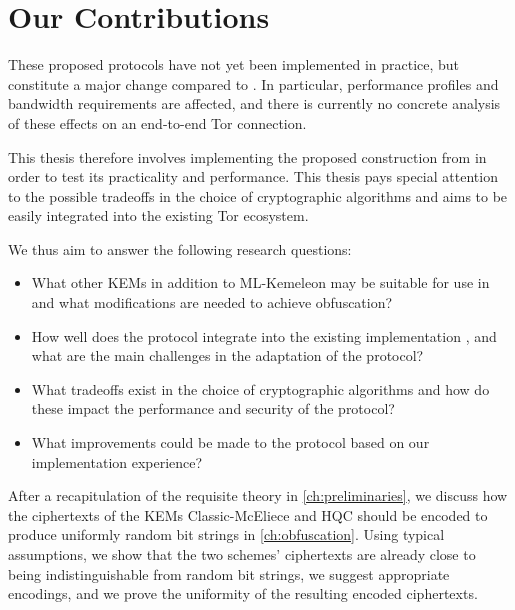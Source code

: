 \section{Our Contributions} \label{sec:contributions}

These proposed protocols have not yet been implemented in practice, but constitute a major change compared to \obfsfour{}.
In particular, performance profiles and bandwidth requirements are affected, and there is currently no concrete analysis of these effects on an end-to-end Tor connection.

This thesis therefore involves implementing the proposed \drivel{} construction from \cite{EPRINT:GRSV25} in order to test its practicality and performance.
This thesis pays special attention to the possible tradeoffs in the choice of cryptographic algorithms and aims to be easily integrated into the existing Tor ecosystem.

We thus aim to answer the following research questions:
\begin{itemize}
    \item What other KEMs in addition to ML-Kemeleon may be suitable for use in \drivel{} and what modifications are needed to achieve obfuscation?
    
    \item How well does the \drivel{} protocol integrate into the existing \obfsfour{} implementation \cite{lyrebird}, and what are the main challenges in the adaptation of the protocol?
    
    \item What tradeoffs exist in the choice of cryptographic algorithms and how do these impact the performance and security of the protocol?
    
    \item What improvements could be made to the \drivel{} protocol based on our implementation experience?
\end{itemize}

After a recapitulation of the requisite theory in \cref{ch:preliminaries}, we discuss how the ciphertexts of the KEMs Classic-McEliece and HQC should be encoded to produce uniformly random bit strings in \cref{ch:obfuscation}. Using typical assumptions, we show that the two schemes' ciphertexts are already close to being indistinguishable from random bit strings, we suggest appropriate encodings, and we prove the uniformity of the resulting encoded ciphertexts.


